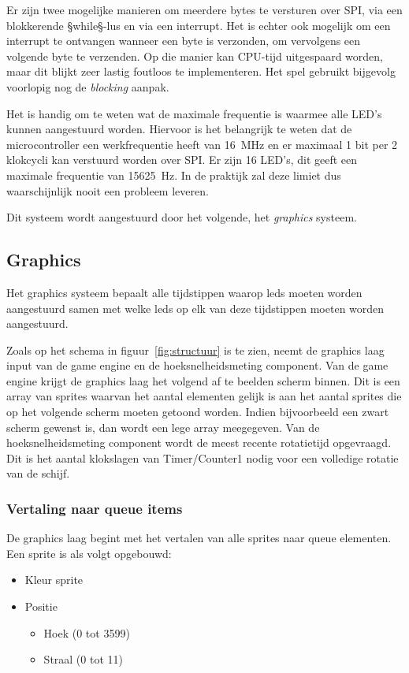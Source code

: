 \documentclass[12pt]{ugentreport}
\begin{document}
Er zijn twee mogelijke manieren om meerdere bytes te versturen over SPI,
via een blokkerende §while§-lus en via een interrupt.
Het is echter ook mogelijk om een interrupt te ontvangen wanneer een byte is
verzonden,
om vervolgens een volgende byte te verzenden. Op die manier kan CPU-tijd
uitgespaard worden, maar dit blijkt zeer lastig foutloos te implementeren.
Het spel gebruikt bijgevolg voorlopig nog de \emph{blocking} aanpak.

Het is handig om te weten wat de maximale frequentie is waarmee alle LED's
kunnen aangestuurd worden.
Hiervoor is het belangrijk te weten dat de microcontroller
een werkfrequentie heeft van \SI{16}{\mega\hertz}
en er maximaal 1 bit per 2 klokcycli kan verstuurd worden over SPI.
Er zijn 16 LED's, dit geeft een maximale frequentie van \SI{15625}{\hertz}.
In de praktijk zal deze limiet dus waarschijnlijk nooit een probleem leveren.

Dit systeem wordt aangestuurd door het volgende, het \emph{graphics} systeem.

\subsection{Graphics}
\label{sec:ledtiming}
Het graphics systeem bepaalt alle tijdstippen waarop leds moeten worden aangestuurd samen met welke leds op elk van deze tijdstippen moeten worden aangestuurd.

Zoals op het schema in figuur~\ref{fig:structuur} is te zien, neemt de graphics laag input van de game engine en de hoeksnelheidsmeting component.
Van de game engine krijgt de graphics laag het volgend af te beelden scherm binnen. Dit is een array van sprites waarvan het aantal
elementen gelijk is aan het aantal sprites die op het volgende scherm moeten getoond worden. Indien bijvoorbeeld een zwart scherm
gewenst is, dan wordt een lege array meegegeven. Van de hoeksnelheidsmeting component wordt de meest recente rotatietijd opgevraagd.
Dit is het aantal klokslagen van Timer/Counter1 nodig voor een volledige rotatie van de schijf.

\subsubsection{Vertaling naar queue items}
De graphics laag begint met het vertalen van alle sprites naar queue elementen.
Een sprite is als volgt opgebouwd:
\begin{itemize}
	\item Kleur sprite
	\item Positie
	\begin{itemize}
		\item Hoek (0 tot 3599)
		\item Straal (0 tot 11)
	\end{itemize}
\end{itemize}
\end{document}

